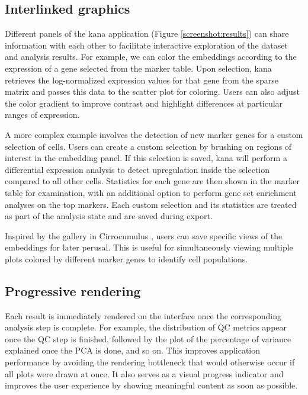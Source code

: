 \documentclass{article}
\begin{document}
\subsection{Interlinked graphics}

Different panels of the kana application (Figure \ref{screenshot:results}) can share information with each other to facilitate interactive exploration of the dataset and analysis results.
For example, we can color the embeddings according to the expression of a gene selected from the marker table.
Upon selection, kana retrieves the log-normalized expression values for that gene from the sparse matrix and passes this data to the scatter plot for coloring.
Users can also adjust the color gradient to improve contrast and highlight differences at particular ranges of expression.

A more complex example involves the detection of new marker genes for a custom selection of cells.
Users can create a custom selection by brushing on regions of interest in the embedding panel.
If this selection is saved, kana will perform a differential expression analysis to detect upregulation inside the selection compared to all other cells.
Statistics for each gene are then shown in the marker table for examination, with an additional option to perform gene set enrichment analyses on the top markers.
Each custom selection and its statistics are treated as part of the analysis state and are saved during export. 

Inspired by the gallery in Cirrocumulus \cite{cirrocumulus}, users can save specific views of the embeddings for later perusal.
This is useful for simultaneously viewing multiple plots colored by different marker genes to identify cell populations.

\subsection{Progressive rendering}

Each result is immediately rendered on the interface once the corresponding analysis step is complete.
For example, the distribution of QC metrics appear once the QC step is finished, followed by the plot of the percentage of variance explained once the PCA is done, and so on.
This improves application performance by avoiding the rendering bottleneck that would otherwise occur if all plots were drawn at once. 
It also serves as a visual progress indicator and improves the user experience by showing meaningful content as soon as possible.
\end{document}
